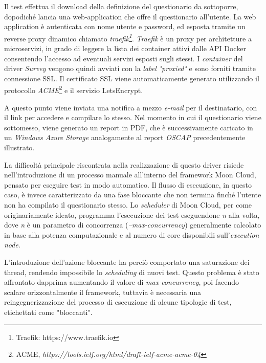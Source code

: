 \documentclass[../main.tex]{subfiles}
\begin{document}
Il test effettua il download della definizione del questionario da sottoporre, dopodiché lancia una web-application che offre il questionario all'utente. La web application è autenticata con nome utente e password, ed esposta tramite un reverse proxy dinamico chiamato \textit{traefik\footnote{Traefik: https://www.traefik.io}}.
\textit{Traefik} è un proxy per architetture a microservizi, in grado di leggere la lista dei container attivi dalle API Docker consentendo l'accesso ad eventuali servizi esposti sugli stessi.
I \textit{container} del driver \textit{Survey} vengono quindi  avviati con la \textit{label} \textit{"proxied"} e sono forniti tramite connessione SSL. Il certificato SSL viene automaticamente generato utilizzando il protocollo \textit{ACME}\footnote{ACME,  \textit{https://tools.ietf.org/html/draft-ietf-acme-acme-04}} e il servizio LetsEncrypt.

A questo punto viene inviata una notifica a mezzo \textit{e-mail} per il destinatario, con il link per accedere e compilare lo stesso.
Nel momento in cui il questionario viene sottomesso, viene generato un report in PDF, che è successivamente caricato in un \textit{Windows Azure Storage} analogamente al report \textit{OSCAP} precedentemente illustrato.

La difficoltà principale riscontrata nella realizzazione di questo driver risiede nell'introduzione di un processo manuale all'interno del framework Moon Cloud, pensato per eseguire test in modo automatico.
Il flusso di esecuzione, in questo caso, è invece caratterizzato da una fase bloccante che non termina finché l'utente non ha compilato il questionario stesso.
Lo \textit{scheduler} di Moon Cloud, per come originariamente ideato, programma l'esecuzione dei test eseguendone \textit{n} alla volta, dove \textit{n} è un parametro di concorrenza (\textit{--max-concurrency}) generalmente calcolato in base alla potenza computazionale e al numero di core disponibili sull'\textit{execution node}.

L'introduzione dell'azione bloccante ha perciò comportato una saturazione dei thread, rendendo impossibile lo \textit{scheduling} di nuovi test.
Questo problema è stato affrontato dapprima aumentando il valore di \textit{max-concurrency}, poi facendo scalare orizzontalmente il framework, tuttavia è necessaria una reingegnerizzazione del processo di esecuzione di alcune tipologie di test, etichettati come "bloccanti".
\end{document}
